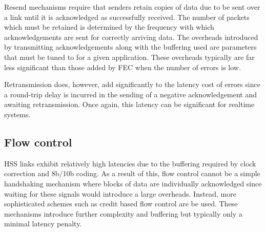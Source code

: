 			Resend mechanisms require that senders retain copies of data due to be
			sent over a link until it is acknowledged as successfully received. The
			number of packets which must be retained is determined by the frequency
			with which acknowledgements are sent for correctly arriving data. The
			overheads introduced by transmitting acknowledgements along with the
			buffering used are parameters that must be tuned to for a given
			application. These overheads typically are far less significant than those
			added by FEC when the number of errors is low.
			
			Retransmission does, however, add significantly to the latency cost of
			errors since a round-trip delay is incurred in the sending of a negative
			acknowledgement and awaiting retransmission. Once again, this latency can
			be significant for realtime systems.
		
		\subsection{Flow control}
			
			HSS links exhibit relatively high latencies due to the buffering required
			by clock correction and 8b/10b coding. As a result of this, flow control
			cannot be a simple handshaking mechanism where blocks of data are
			individually acknowledged since waiting for these signals would introduce
			a large overheads. Instead, more sophisticated schemes such as credit
			based flow control \cite{dally04} are be used.  These mechanisms introduce
			further complexity and buffering but typically only a minimal latency
			penalty.

